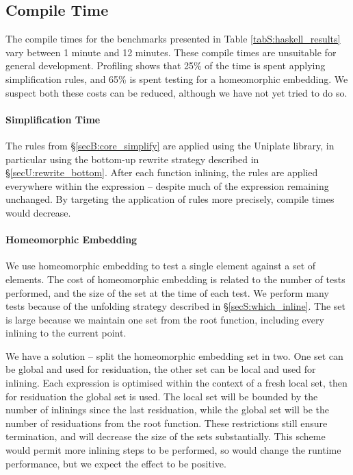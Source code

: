 \subsection{Compile Time}
\label{secS:compile_time}

The compile times for the benchmarks presented in Table \ref{tabS:haskell_results} vary between 1 minute and 12 minutes. These compile times are unsuitable for general development. Profiling shows that 25\% of the time is spent applying simplification rules, and 65\% is spent testing for a homeomorphic embedding. We suspect both these costs can be reduced, although we have not yet tried to do so.

\paragraph{Simplification Time} The rules from \S\ref{secB:core_simplify} are applied using the Uniplate library, in particular using the bottom-up rewrite strategy described in \S\ref{secU:rewrite_bottom}. After each function inlining, the rules are applied everywhere within the expression -- despite much of the expression remaining unchanged. By targeting the application of rules more precisely, compile times would decrease.

\paragraph{Homeomorphic Embedding} We use homeomorphic embedding to test a single element against a set of elements. The cost of homeomorphic embedding is related to the number of tests performed, and the size of the set at the time of each test. We perform many tests because of the unfolding strategy described in \S\ref{secS:which_inline}. The set is large because we maintain one set from the root function, including every inlining to the current point.

We have a solution -- split the homeomorphic embedding set in two. One set can be global and used for residuation, the other set can be local and used for inlining. Each expression is optimised within the context of a fresh local set, then for residuation the global set is used. The local set will be bounded by the number of inlinings since the last residuation, while the global set will be the number of residuations from the root function. These restrictions still ensure termination, and will decrease the size of the sets substantially. This scheme would permit more inlining steps to be performed, so would change the runtime performance, but we expect the effect to be positive.


